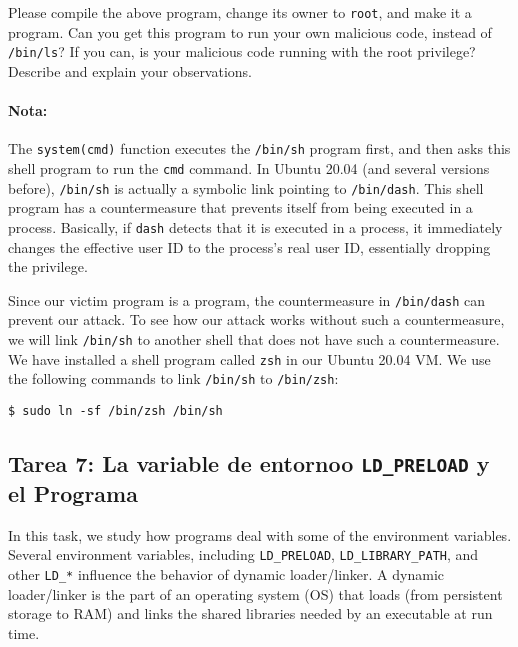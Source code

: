 Please compile the above program, change its owner to {\tt root}, and
make it a \setuid program.  Can you get this \setuid program to
run your own malicious code, instead of
{\tt /bin/ls}?  If you can, is your malicious code running with the root privilege?
Describe and explain your observations. \\


\paragraph{Nota:}
The \texttt{system(cmd)} function executes the \texttt{/bin/sh} program first, and then
asks this shell program to run the \texttt{cmd} command.
In Ubuntu 20.04 (and several versions before), \texttt{/bin/sh} is actually
a symbolic link pointing to \texttt{/bin/dash}.
This shell program has a countermeasure that prevents itself
from being executed in a \setuid process.  Basically, if \texttt{dash} detects that it is
executed in a \setuid process, it immediately changes the effective user ID to the process's
real user ID, essentially dropping the privilege.


Since our victim program is a \setuid program,
the countermeasure in \texttt{/bin/dash} can prevent our attack.
To see how our attack works without such a countermeasure,
we will link \texttt{/bin/sh} to another shell that does not
have such a countermeasure.  We have installed a shell program
called \texttt{zsh} in our Ubuntu 20.04 VM. We use the following
commands to link \texttt{/bin/sh} to \texttt{/bin/zsh}:

\begin{lstlisting}
$ sudo ln -sf /bin/zsh /bin/sh
\end{lstlisting}




\subsection{Tarea 7: La variable de entornoo {\tt LD\_PRELOAD} y el Programa \setuid}


In this task, we study how \setuid programs deal
with some of the environment variables.
Several environment variables, including {\tt LD\_PRELOAD},
{\tt LD\_LIBRARY\_PATH}, and other {\tt LD\_*} influence the
behavior of dynamic loader/linker.
A dynamic loader/linker is the part of an operating system (OS) that
loads (from persistent storage to RAM) and links the shared libraries
needed by an executable at run time.

